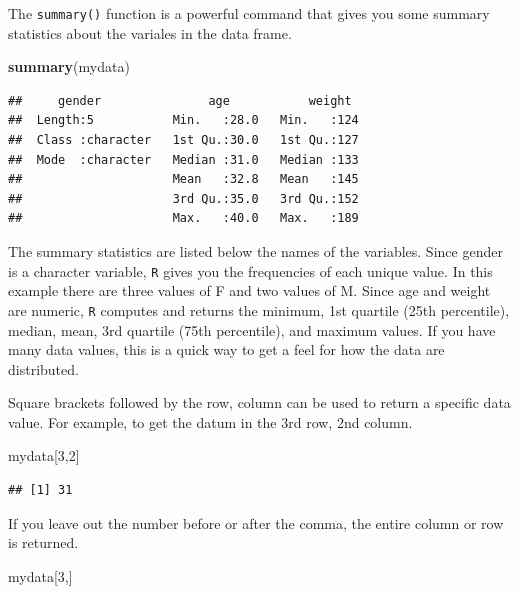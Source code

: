 \documentclass[
]{book}
\newenvironment{Shaded}{\begin{snugshade}}{\end{snugshade}}
\newcommand{\DecValTok}[1]{\textcolor[rgb]{0.00,0.00,0.81}{#1}}
\newcommand{\KeywordTok}[1]{\textcolor[rgb]{0.13,0.29,0.53}{\textbf{#1}}}
\newcommand{\NormalTok}[1]{#1}
\begin{document}
The \texttt{summary()} function is a powerful command that gives you some summary statistics about the variales in the data frame.

\begin{Shaded}
\begin{Highlighting}[]
\KeywordTok{summary}\NormalTok{(mydata)}
\end{Highlighting}
\end{Shaded}

\begin{verbatim}
##     gender               age           weight   
##  Length:5           Min.   :28.0   Min.   :124  
##  Class :character   1st Qu.:30.0   1st Qu.:127  
##  Mode  :character   Median :31.0   Median :133  
##                     Mean   :32.8   Mean   :145  
##                     3rd Qu.:35.0   3rd Qu.:152  
##                     Max.   :40.0   Max.   :189
\end{verbatim}

The summary statistics are listed below the names of the variables. Since gender is a character variable, \texttt{R} gives you the frequencies of each unique value. In this example there are three values of F and two values of M. Since age and weight are numeric, \texttt{R} computes and returns the minimum, 1st quartile (25th percentile), median, mean, 3rd quartile (75th percentile), and maximum values. If you have many data values, this is a quick way to get a feel for how the data are distributed.

Square brackets followed by the row, column can be used to return a specific data value. For example, to get the datum in the 3rd row, 2nd column.

\begin{Shaded}
\begin{Highlighting}[]
\NormalTok{mydata[}\DecValTok{3}\NormalTok{,}\DecValTok{2}\NormalTok{]}
\end{Highlighting}
\end{Shaded}

\begin{verbatim}
## [1] 31
\end{verbatim}

If you leave out the number before or after the comma, the entire column or row is returned.

\begin{Shaded}
\begin{Highlighting}[]
\NormalTok{mydata[}\DecValTok{3}\NormalTok{,]}
\end{Highlighting}
\end{Shaded}
\end{document}
